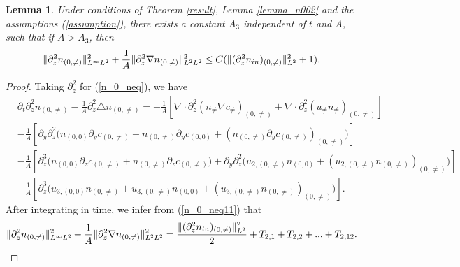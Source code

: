 \documentclass[12pt, reqno]{amsart}
\newtheorem{lemma}{Lemma}[section]
\numberwithin{equation}{section}
\begin{document}
	\begin{lemma}\label{lemma_n003}
		Under conditions of Theorem \ref{result}, Lemma \ref{lemma_n002} and the assumptions (\ref{assumption}), 	there exists a constant $A_3$ independent of $t$ and $A$, such that if $A>A_3$, then
		$$\|\partial_z^2n_{(0,\neq)}\|^2_{L^{\infty}L^2}+
		\frac{1}{A}\|\partial_z^2\nabla n_{(0,\neq)}\|^2_{L^2L^2}\leq C(\|(\partial_z^2n_{\rm in})_{(0,\neq)}\|_{L^2}^2
		+1).$$
	\end{lemma}
	\begin{proof}
		Taking $\partial_z^2$ for (\ref{n_0_neq}), we have
		\begin{equation}\label{n_0_neq11}
			\begin{aligned}
				&\partial_t \partial_z^2n_{(0,\neq)}
				-\frac{1}{A}\partial_z^2\triangle n_{(0,\neq)}
				=-\frac{1}{A}\left[\nabla\cdot\partial_z^2(n_{\neq}\nabla c_{\neq})_{(0,\neq)}
				+\nabla\cdot\partial_z^2(u_{\neq}n_{\neq})_{(0,\neq)}\right]\\
				&-\frac{1}{A}\left[\partial_y\partial_z^2\big(n_{(0,0)}\partial_{y}c_{(0,\neq)}
				+n_{(0,\neq)}\partial_{y}c_{(0,0)}
				+(n_{(0,\neq)}\partial_{y}c_{(0,\neq)})_{(0,\neq)}\big)\right]\\
				&-\frac{1}{A}\left[\partial_z^3\big(n_{(0,0)}\partial_{z}c_{(0,\neq)}  
				+n_{(0,\neq)}\partial_{z}c_{(0,\neq)}\big)
				+\partial_y\partial_z^2\big(u_{2,(0,\neq)}n_{(0,0)}
				+(u_{2,(0,\neq)}n_{(0,\neq)})_{(0,\neq)}\big)\right]\\
				&-\frac{1}{A}\left[\partial_z^3\big(u_{3,(0,0)}n_{(0,\neq)}
				+u_{3,(0,\neq)}n_{(0,0)}
				+(u_{3,(0,\neq)}n_{(0,\neq)})_{(0,\neq)}\big)\right].
			\end{aligned}
		\end{equation}
		After integrating in time, we infer from (\ref{n_0_neq11}) that 
		\begin{equation}\label{n_0_neq12}
			\|\partial_z^2n_{(0,\neq)}\|^2_{L^{\infty}L^2}+
			\frac{1}{A}\|\partial_z^2\nabla n_{(0,\neq)}\|^2_{L^2L^2}= \frac{\|(\partial_z^2n_{\rm in})_{(0,\neq)}\|_{L^2}^2}{2}
			+T_{2,1}+T_{2,2}+...+T_{2,12}.
		\end{equation}
		

\end{proof}
\end{document}
